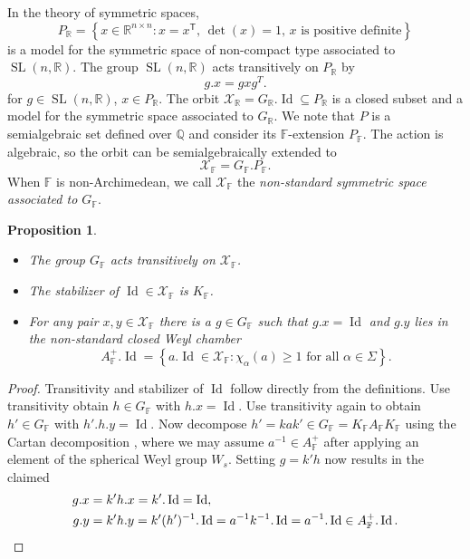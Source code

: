 \documentclass[12pt]{amsart}
\newcommand{\F}{\mathbb{F} }
\newcommand{\R}{\mathbb{R} }
\newcommand{\Q}{\mathbb{Q} }
\newcommand{\X}{\mathcal{X}}
\newcommand{\ApF}{A_\F^+}
\newcommand{\tran}{{^{\mathsf{T}}\!}}
\numberwithin{equation}{section}
\newtheorem{proposition}[theorem]{Proposition}
\theoremstyle{remark} %
\begin{document}
In the theory of symmetric spaces, 
$$
P_\R = \left\{ x \in \R^{n\times n} \colon x=x\tran,\, \det(x)=1,\, x \text{ is positive definite}  \right\} 
$$
is a model for the symmetric space of non-compact type associated to $\operatorname{SL}(n,\R)$. The group $\operatorname{SL}(n,\R)$ acts transitively on $P_\R$ by
$$
g.x = g x g^{T}.
$$
for $g\in \operatorname{SL}(n,\R)$, $x \in P_\R$. The orbit $\X_\R = G_\R.\operatorname{Id} \subseteq P_\R$ is a closed subset and a model for the symmetric space associated to $G_\R$. We note that $P$ is a semialgebraic set defined over $\Q$ and consider its $\F$-extension $P_\F$. The action is algebraic, so the orbit can be semialgebraically extended to
$$
\X_\F = G_\F . P_\F.
$$
When $\F$ is non-Archimedean, we call $\X_\F$ the \emph{non-standard symmetric space associated to $G_\F$}. 
\begin{proposition}\label{prop:trans}
	\begin{itemize}
		\item [(a)] The group $G_\F$ acts transitively on $\X_\F$.
		\item [(b)] The stabilizer of $\operatorname{Id}\in \X_\F$ is $K_\F$.
		\item  [(c)] For any pair $x,y \in \X_\F$ there is a $g\in G_\F$ such that $g.x=\operatorname{Id}$ and $g.y$ lies in the non-standard closed Weyl chamber
		$$
		\ApF. \operatorname{Id} = \left\{ a.\operatorname{Id} \in \X_\F \colon \chi_\alpha(a) \geq 1 \text{ for all } \alpha \in \Sigma \right\}.
		$$
	\end{itemize}
\end{proposition}
\begin{proof}
	Transitivity and stabilizer of $\operatorname{Id}$ follow directly from the definitions. Use transitivity obtain $h \in G_\F$ with $h.x  =\operatorname{Id}$. Use transitivity again to obtain $h'\in G_\F$ with $h'.h.y =\operatorname{Id}$. Now decompose $h'=kak' \in G_\F = K_\F A_\F K_\F$ using the Cartan decomposition \cite[Theorem \ref{I-thm:KAK}]{AppAGRCF}, where we may assume $a^{-1}\in \ApF$ after applying an element of the spherical Weyl group $W_s$. Setting $g=k'h$ now results in the claimed
	\begin{align*}
		g.x &= k'h.x = k'.\operatorname{Id} = \operatorname{Id}, \\
		g.y &= k'h.y = k'(h')^{-1}.\operatorname{Id} = a^{-1}k^{-1}.\operatorname{Id} = a^{-1}.\operatorname{Id} \in \ApF . \operatorname{Id}. \qedhere
	\end{align*}
\end{proof}
\end{document}
